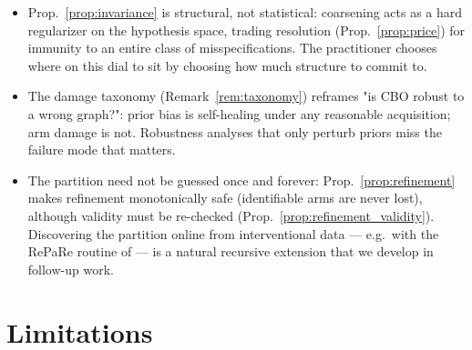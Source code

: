 \documentclass{article}
\begin{document}
\begin{itemize}[leftmargin=1.2em,itemsep=1pt,topsep=2pt]
  \item Prop.~\ref{prop:invariance} is structural, not statistical:
  coarsening acts as a hard regularizer on the hypothesis space, trading
  resolution (Prop.~\ref{prop:price}) for immunity to an entire class of
  misspecifications. The practitioner chooses where on this dial to sit by
  choosing how much structure to commit to.
  \item The damage taxonomy (Remark~\ref{rem:taxonomy}) reframes "is CBO
  robust to a wrong graph?": prior bias is self-healing under any
  reasonable acquisition; arm damage is not. Robustness analyses that only
  perturb priors miss the failure mode that matters.
  \item The partition need not be guessed once and forever:
  Prop.~\ref{prop:refinement} makes refinement monotonically safe
  (identifiable arms are never lost), although validity must be re-checked
  (Prop.~\ref{prop:refinement_validity}). Discovering the partition online
  from interventional data --- e.g.\ with the RePaRe routine of
  \citet{madaleno2026coarsening} --- is a natural recursive extension that
  we develop in follow-up work.
\end{itemize}

\section{Limitations}
\label{sec:limitations}
\end{document}
